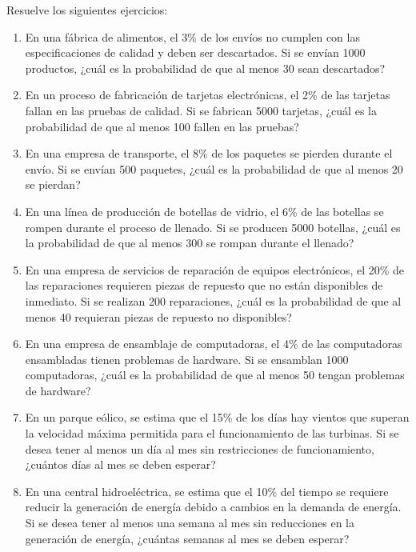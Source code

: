 \begin{Ejer}
Resuelve los siguientes ejercicios:
\begin{enumerate}


    \item En una fábrica de alimentos, el 3\% de los envíos no cumplen con las especificaciones de calidad y deben ser descartados. Si se envían 1000 productos, ¿cuál es la probabilidad de que al menos 30 sean descartados?

    \item En un proceso de fabricación de tarjetas electrónicas, el 2\% de las tarjetas fallan en las pruebas de calidad. Si se fabrican 5000 tarjetas, ¿cuál es la probabilidad de que al menos 100 fallen en las pruebas?

    \item En una empresa de transporte, el 8\% de los paquetes se pierden durante el envío. Si se envían 500 paquetes, ¿cuál es la probabilidad de que al menos 20 se pierdan?

    \item En una línea de producción de botellas de vidrio, el 6\% de las botellas se rompen durante el proceso de llenado. Si se producen 5000 botellas, ¿cuál es la probabilidad de que al menos 300 se rompan durante el llenado?

    \item En una empresa de servicios de reparación de equipos electrónicos, el 20\% de las reparaciones requieren piezas de repuesto que no están disponibles de inmediato. Si se realizan 200 reparaciones, ¿cuál es la probabilidad de que al menos 40 requieran piezas de repuesto no disponibles?

    \item En una empresa de ensamblaje de computadoras, el 4\% de las computadoras ensambladas tienen problemas de hardware. Si se ensamblan 1000 computadoras, ¿cuál es la probabilidad de que al menos 50 tengan problemas de hardware?

    \item En un parque eólico, se estima que el 15\% de los días hay vientos que superan la velocidad máxima permitida para el funcionamiento de las turbinas. Si se desea tener al menos un día al mes sin restricciones de funcionamiento, ¿cuántos días al mes se deben esperar?

    \item En una central hidroeléctrica, se estima que el 10\% del tiempo se requiere reducir la generación de energía debido a cambios en la demanda de energía. Si se desea tener al menos una semana al mes sin reducciones en la generación de energía, ¿cuántas semanas al mes se deben esperar?


\end{enumerate}
\end{Ejer}
